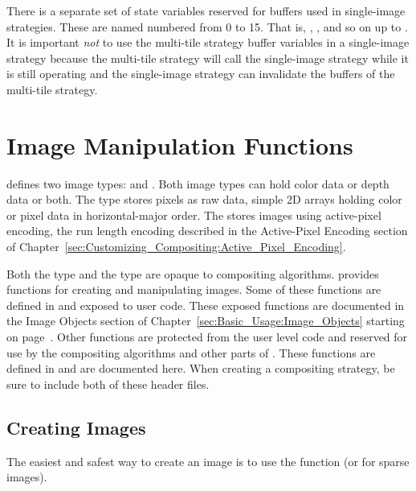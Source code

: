 There is a separate set of state variables reserved for buffers used in
single-image strategies.  These are named
 numbered from 0 to 15.
That is, ,
, and so on up to
.  It is important \emph{not} to use
the multi-tile strategy buffer variables in a single-image strategy because
the multi-tile strategy will call the single-image strategy while it is
still operating and the single-image strategy can invalidate the buffers of
the multi-tile strategy.

\section{Image Manipulation Functions}

\IceT defines two image types:  and
.  Both image types can hold color data or depth
data or both.  The  type stores pixels as raw data, simple
2D arrays holding color or pixel data in horizontal-major order.  The
 stores images using
active-pixel encoding, the run length encoding
described in the Active-Pixel Encoding section of
Chapter~\ref{sec:Customizing_Compositing:Active_Pixel_Encoding}.

Both the  type and the  type are
opaque to compositing algorithms.  \IceT provides functions for creating
and manipulating images.  Some of these functions are defined in
 and exposed to user code.  These exposed
functions are documented in the Image Objects section of
Chapter~\ref{sec:Basic_Usage:Image_Objects} starting on
page~\pageref{sec:Basic_Usage:Image_Objects}.  Other functions are
protected from the user level code and reserved for use by the compositing
algorithms and other parts of \IceT.  These functions are defined in
 and are documented here.  When
creating a compositing strategy, be sure to include both of these header
files.

\subsection{Creating Images}

\label{manpage:icetGetStateBufferImage}
\label{manpage:icetGetStateBufferSparseImage}
The easiest and safest way to create an image is to use the
 function (or
 for sparse images).

